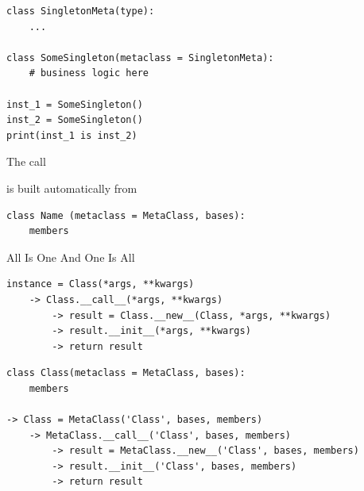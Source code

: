 
\begin{frame}[fragile]
%
\begin{codebox}
\begin{verbatim}
class SingletonMeta(type):
    ...

class SomeSingleton(metaclass = SingletonMeta):
    # business logic here

inst_1 = SomeSingleton()
inst_2 = SomeSingleton()
print(inst_1 is inst_2)
\end{verbatim}
\end{codebox}
%
\begin{hintbox}
\footnotesize
The call

\vspace{3pt}
\vspace{3pt}

is built automatically from

\begin{verbatim}
class Name (metaclass = MetaClass, bases):
    members
\end{verbatim}
\end{hintbox}
%
\end{frame}


\begin{frame}[fragile]{All Is One And One Is All}
%
\begin{codebox}
\begin{verbatim}
instance = Class(*args, **kwargs)
    -> Class.__call__(*args, **kwargs)
        -> result = Class.__new__(Class, *args, **kwargs)
        -> result.__init__(*args, **kwargs)
        -> return result
\end{verbatim}
\end{codebox}
%
\vspace{-3pt}
\begin{codebox}
\begin{verbatim}
class Class(metaclass = MetaClass, bases): 
    members

-> Class = MetaClass('Class', bases, members)
    -> MetaClass.__call__('Class', bases, members)
        -> result = MetaClass.__new__('Class', bases, members)
        -> result.__init__('Class', bases, members)
        -> return result
\end{verbatim}
\end{codebox}
%
\end{frame}

